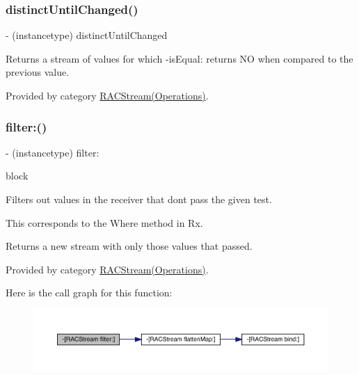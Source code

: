 \subsubsection{\texorpdfstring{distinct\+Until\+Changed()}{distinctUntilChanged()}\hspace{0.1cm}{\footnotesize\ttfamily [3/3]}}
{\footnotesize\ttfamily -\/ (instancetype) distinct\+Until\+Changed \begin{DoxyParamCaption}{ }\end{DoxyParamCaption}}

Returns a stream of values for which -\/is\+Equal\+: returns NO when compared to the previous value. 

Provided by category \mbox{\hyperlink{category_r_a_c_stream_07_operations_08_a3af010b929b0c232ddbaa52f574fb888}{R\+A\+C\+Stream(\+Operations)}}.

\mbox{\label{interface_r_a_c_stream_ae6a990d05708acea33f1c31102f4989b}} 
\subsubsection{\texorpdfstring{filter\+:()}{filter:()}\hspace{0.1cm}{\footnotesize\ttfamily [1/3]}}
{\footnotesize\ttfamily -\/ (instancetype) filter\+: \begin{DoxyParamCaption}\item[{(B\+O\+OL($^\wedge$)(id value))}]{block }\end{DoxyParamCaption}}

Filters out values in the receiver that don\textquotesingle{}t pass the given test.

This corresponds to the {\ttfamily Where} method in Rx.

Returns a new stream with only those values that passed. 

Provided by category \mbox{\hyperlink{category_r_a_c_stream_07_operations_08_ae6a990d05708acea33f1c31102f4989b}{R\+A\+C\+Stream(\+Operations)}}.

Here is the call graph for this function\+:\nopagebreak
\begin{figure}[H]
\begin{center}
\leavevmode
\includegraphics[width=350pt]{interface_r_a_c_stream_ae6a990d05708acea33f1c31102f4989b_cgraph}
\end{center}
\end{figure}
\mbox{\label{interface_r_a_c_stream_ae6a990d05708acea33f1c31102f4989b}} 
